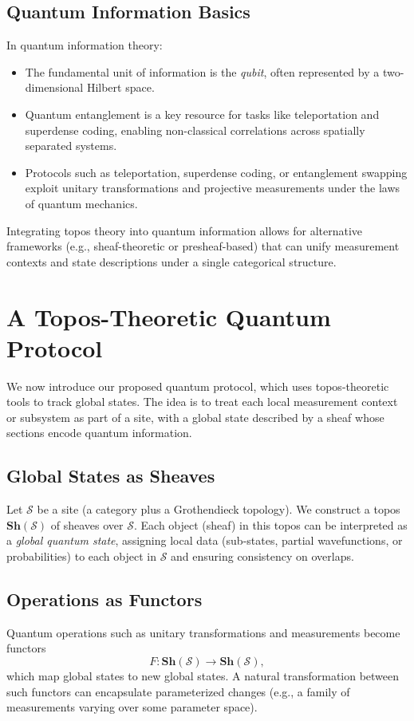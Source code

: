 \documentclass[11pt]{article}
\begin{document}
\subsection{Quantum Information Basics}
In quantum information theory:
\begin{itemize}
    \item The fundamental unit of information is the \emph{qubit}, often represented by a two-dimensional Hilbert space.
    \item Quantum entanglement is a key resource for tasks like teleportation and superdense coding, enabling non-classical correlations across spatially separated systems.
    \item Protocols such as teleportation, superdense coding, or entanglement swapping exploit unitary transformations and projective measurements under the laws of quantum mechanics.
\end{itemize}
Integrating topos theory into quantum information allows for alternative frameworks (e.g., sheaf-theoretic or presheaf-based) that can unify measurement contexts and state descriptions under a single categorical structure.

\section{A Topos-Theoretic Quantum Protocol}\label{sec:protocol}
We now introduce our proposed quantum protocol, which uses topos-theoretic tools to track global states. The idea is to treat each local measurement context or subsystem as part of a site, with a global state described by a sheaf whose sections encode quantum information.

\subsection{Global States as Sheaves}
Let $\mathcal{S}$ be a site (a category plus a Grothendieck topology). We construct a topos $\mathbf{Sh}(\mathcal{S})$ of sheaves over $\mathcal{S}$. Each object (sheaf) in this topos can be interpreted as a \emph{global quantum state}, assigning local data (sub-states, partial wavefunctions, or probabilities) to each object in $\mathcal{S}$ and ensuring consistency on overlaps.

\subsection{Operations as Functors}
Quantum operations such as unitary transformations and measurements become functors
\[
F: \mathbf{Sh}(\mathcal{S}) \longrightarrow \mathbf{Sh}(\mathcal{S}),
\]
which map global states to new global states. A natural transformation between such functors can encapsulate parameterized changes (e.g., a family of measurements varying over some parameter space).
\end{document}
